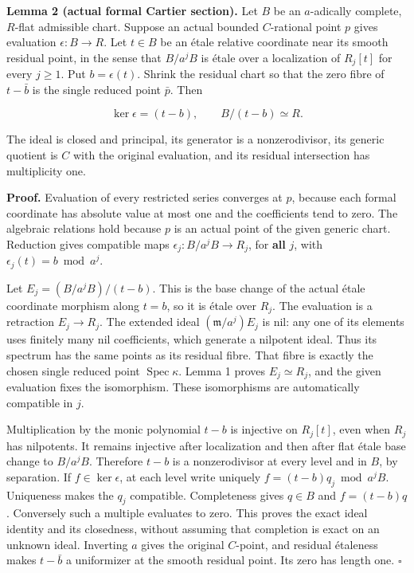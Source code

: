\documentclass[
  11pt,
]{article}
\begin{document}
\textbf{Lemma 2 (actual formal Cartier section).} Let \(B\) be an
\(a\)-adically complete, \(R\)-flat admissible chart. Suppose an actual
bounded \(C\)-rational point \(p\) gives evaluation \(\epsilon:B\to R\).
Let \(t\in B\) be an étale relative coordinate near its smooth residual
point, in the sense that \(B/a^jB\) is étale over a localization of
\(R_j[t]\) for every \(j\geq1\). Put \(b=\epsilon(t)\). Shrink the
residual chart so that the zero fibre of \(t-\bar b\) is the single
reduced point \(\bar p\). Then

\[
 \ker\epsilon=(t-b),\qquad B/(t-b)\simeq R.
\]

The ideal is closed and principal, its generator is a nonzerodivisor,
its generic quotient is \(C\) with the original evaluation, and its
residual intersection has multiplicity one.

\textbf{Proof.} Evaluation of every restricted series converges at
\(p\), because each formal coordinate has absolute value at most one and
the coefficients tend to zero. The algebraic relations hold because
\(p\) is an actual point of the given generic chart. Reduction gives
compatible maps \(\epsilon_j:B/a^jB\to R_j\), for \textbf{all} \(j\),
with \(\epsilon_j(t)=b\bmod a^j\).

Let \(E_j=(B/a^jB)/(t-b)\). This is the base change of the actual étale
coordinate morphism along \(t=b\), so it is étale over \(R_j\). The
evaluation is a retraction \(E_j\to R_j\). The extended ideal
\((\mathfrak m/a^j)E_j\) is nil: any one of its elements uses finitely
many nil coefficients, which generate a nilpotent ideal. Thus its
spectrum has the same points as its residual fibre. That fibre is
exactly the chosen single reduced point \(\operatorname{Spec}\kappa\).
Lemma 1 proves \(E_j\simeq R_j\), and the given evaluation fixes the
isomorphism. These isomorphisms are automatically compatible in \(j\).

Multiplication by the monic polynomial \(t-b\) is injective on
\(R_j[t]\), even when \(R_j\) has nilpotents. It remains injective after
localization and then after flat étale base change to \(B/a^jB\).
Therefore \(t-b\) is a nonzerodivisor at every level and in \(B\), by
separation. If \(f\in\ker\epsilon\), at each level write uniquely
\(f=(t-b)q_j\bmod a^jB\). Uniqueness makes the \(q_j\) compatible.
Completeness gives \(q\in B\) and \(f=(t-b)q\). Conversely such a
multiple evaluates to zero. This proves the exact ideal identity and its
closedness, without assuming that completion is exact on an unknown
ideal. Inverting \(a\) gives the original \(C\)-point, and residual
étaleness makes \(t-\bar b\) a uniformizer at the smooth residual point.
Its zero has length one. \(\square\)
\end{document}
